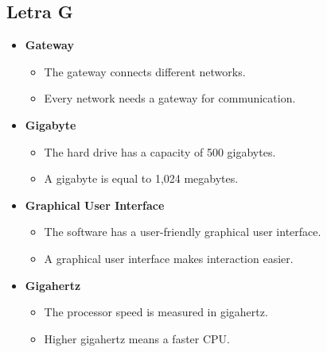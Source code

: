     \subsection{Letra G}
    \begin{itemize}
        \item \textbf{Gateway}
        \begin{itemize}
            \item The gateway connects different networks.
            \item Every network needs a gateway for communication.
        \end{itemize}
        \item \textbf{Gigabyte}
        \begin{itemize}
            \item The hard drive has a capacity of 500 gigabytes.
            \item A gigabyte is equal to 1,024 megabytes.
        \end{itemize}
        \item \textbf{Graphical User Interface}
        \begin{itemize}
            \item The software has a user-friendly graphical user interface.
            \item A graphical user interface makes interaction easier.
        \end{itemize}
        \item \textbf{Gigahertz}
        \begin{itemize}
            \item The processor speed is measured in gigahertz.
            \item Higher gigahertz means a faster CPU.
        \end{itemize}
    \end{itemize}


